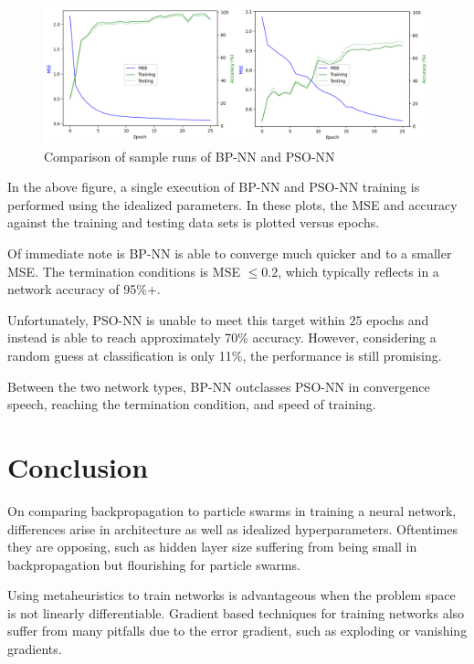\documentclass[a4paper,12pt]{article}
\begin{document}
\begin{figure}[h!]
\centering
\includegraphics[scale=0.48]{images/compare.png}
\caption{Comparison of sample runs of BP-NN and PSO-NN}
\label{fig:plot-compare}
\end{figure}

\pagebreak

In the above figure, a single execution of BP-NN and PSO-NN training is performed using the idealized parameters. In these plots, the MSE and accuracy against the training and testing data sets is plotted versus epochs.

Of immediate note is BP-NN is able to converge much quicker and to a smaller MSE. The termination conditions is MSE $\leq 0.2$, which typically reflects in a network accuracy of 95\%+.

Unfortunately, PSO-NN is unable to meet this target within $25$ epochs and instead is able to reach approximately 70\% accuracy. However, considering a random guess at classification is only 11\%, the performance is still promising.

Between the two network types, BP-NN outclasses PSO-NN in convergence speech, reaching the termination condition, and speed of training.

\section{Conclusion}

On comparing backpropagation to particle swarms in training a neural network, differences arise in architecture as well as idealized hyperparameters. Oftentimes they are opposing, such as hidden layer size suffering from being small in backpropagation but flourishing for particle swarms.

Using metaheuristics to train networks is advantageous when the problem space is not linearly differentiable. Gradient based techniques for training networks also suffer from many pitfalls due to the error gradient, such as exploding or vanishing gradients.
\end{document}
